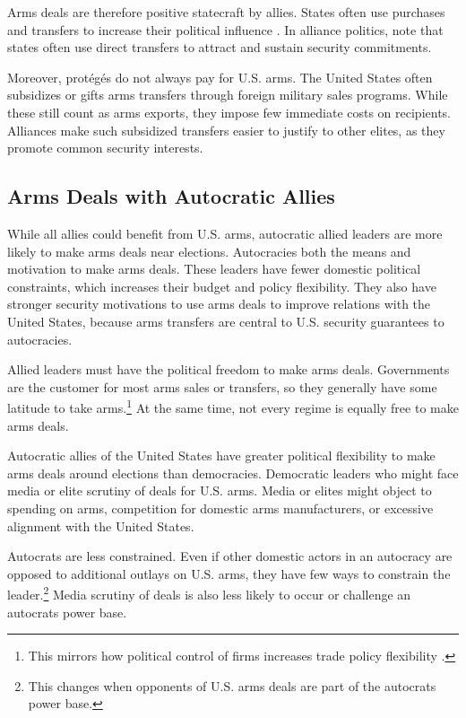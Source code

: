 \documentclass[12pt]{article}
\begin{document}
Arms deals are therefore positive statecraft by allies. 
States often use purchases and transfers to increase their political influence \citep[pg. 42-3]{Baldwin2020}.
In alliance politics, \citet[pg. 184-5]{IkenberryGrieco2003} note that states often use direct transfers to attract and sustain security commitments.  


Moreover, prot{\'e}g{\'e}s do not always pay for U.S. arms.
The United States often subsidizes or gifts arms transfers through foreign military sales programs. 
While these still count as arms exports, they impose few immediate costs on recipients.
Alliances make such subsidized transfers easier to justify to other elites, as they promote common security interests. 


\subsection{Arms Deals with Autocratic Allies}


While all allies could benefit from U.S. arms, autocratic allied leaders are more likely to make arms deals near elections. 
Autocracies both the means and motivation to make arms deals.
These leaders have fewer domestic political constraints, which increases their budget and policy flexibility. 
They also have stronger security motivations to use arms deals to improve relations with the United States, because arms transfers are central to U.S. security guarantees to autocracies.


Allied leaders must have the political freedom to make arms deals.
Governments are the customer for most arms sales or transfers, so they generally have some latitude to take arms.\footnote{This mirrors how political control of firms increases trade policy flexibility \citep{Davisetal2019}.}
At the same time, not every regime is equally free to make arms deals. 


Autocratic allies of the United States have greater political flexibility to make arms deals around elections than democracies. 
Democratic leaders who might face media or elite scrutiny of deals for U.S. arms.
Media or elites might object to spending on arms, competition for domestic arms manufacturers, or excessive alignment with the United States.


Autocrats are less constrained.
Even if other domestic actors in an autocracy are opposed to additional outlays on U.S. arms, they have few ways to constrain the leader.\footnote{This changes when opponents of U.S. arms deals are part of the autocrats power base.}
Media scrutiny of deals is also less likely to occur or challenge an autocrats power base. 
\end{document}
